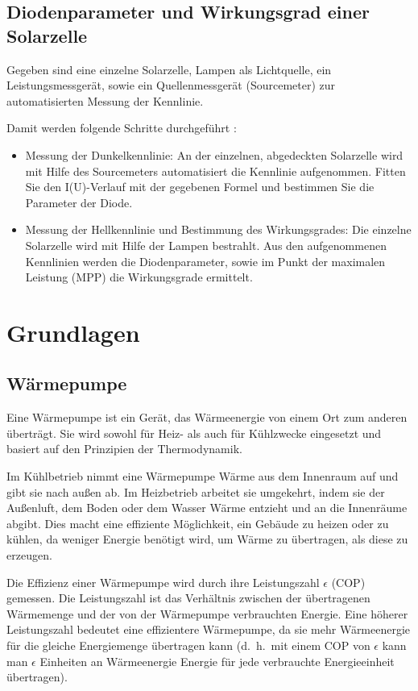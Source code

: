 \documentclass[12pt,english,ngerman]{scrartcl}
\begin{document}
\subsection{Diodenparameter und Wirkungsgrad einer Solarzelle}

Gegeben sind eine einzelne Solarzelle, Lampen als Lichtquelle, ein
Leistungsmessgerät, sowie ein Quellenmessgerät (Sourcemeter) zur
automatisierten Messung der Kennlinie.

Damit werden folgende Schritte durchgeführt \cite{unterlagen_solarzelle}:

\begin{itemize}
	\item Messung der Dunkelkennlinie: An der einzelnen, abgedeckten Solarzelle wird mit
	      Hilfe des Sourcemeters automatisiert die Kennlinie aufgenommen. Fitten Sie den
	      I(U)-Verlauf mit der gegebenen Formel und bestimmen Sie die Parameter der
	      Diode.
	\item Messung der Hellkennlinie und Bestimmung des Wirkungsgrades: Die einzelne
	      Solarzelle wird mit Hilfe der Lampen bestrahlt. Aus den aufgenommenen
	      Kennlinien werden die Diodenparameter, sowie im Punkt der maximalen Leistung
	      (MPP) die Wirkungsgrade ermittelt.
\end{itemize}

\section{Grundlagen}\label{Grund}

\subsection{Wärmepumpe}
Eine Wärmepumpe ist ein Gerät, das Wärmeenergie von einem Ort zum anderen
überträgt. Sie wird sowohl für Heiz- als auch für Kühlzwecke eingesetzt und
basiert auf den Prinzipien der Thermodynamik.

Im Kühlbetrieb nimmt eine Wärmepumpe Wärme aus dem Innenraum auf und gibt
sie nach außen ab. Im Heizbetrieb arbeitet sie umgekehrt, indem sie der
Außenluft, dem Boden oder dem Wasser Wärme entzieht und an die Innenräume abgibt. Dies macht eine
effiziente Möglichkeit, ein Gebäude zu heizen oder zu kühlen, da weniger
Energie benötigt wird, um Wärme zu übertragen, als diese zu erzeugen.

Die Effizienz einer Wärmepumpe wird durch ihre Leistungszahl $\epsilon$ (COP)
gemessen. Die Leistungszahl ist das Verhältnis zwischen der übertragenen
Wärmemenge und der von der Wärmepumpe verbrauchten Energie. Eine höherer
Leistungszahl bedeutet eine effizientere Wärmepumpe, da sie mehr
Wärmeenergie für die gleiche Energiemenge übertragen kann (d.\ h.\ mit einem COP von $\epsilon$ kann man
$\epsilon$ Einheiten an Wärmeenergie Energie für jede verbrauchte
Energieeinheit übertragen).
\end{document}
